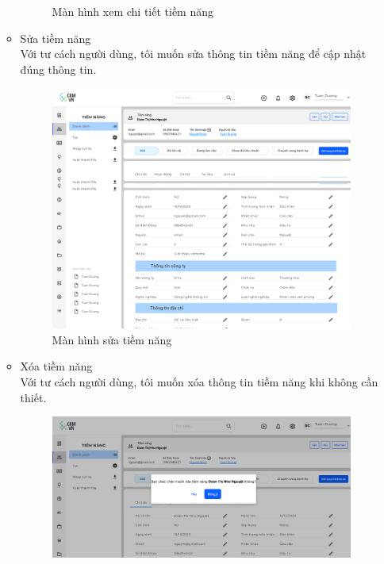 \documentclass[12pt,a4paper]{article}
\begin{document}
\begin{enumerate}
\begin{itemize}
\begin{figure}[H]
                \vspace{0.5cm}
                \caption{Màn hình xem chi tiết tiềm năng}
                \label{chitiettiemnang}
            \end{figure}
            \item Sửa tiềm năng \\
            Với tư cách người dùng, tôi muốn sửa thông tin tiềm năng để cập nhật đúng thông tin.
            \begin{figure}[H]
                \centering \includegraphics[width=\textwidth]{Img/Nguyet/chitiettiemnang.png}
                \vspace{0.5cm}
                \caption{Màn hình sửa tiềm năng}
                \label{suatiemnang}
            \end{figure}
            \item Xóa tiềm năng \\
            Với tư cách người dùng, tôi muốn xóa thông tin tiềm năng khi không cần thiết.
            \begin{figure}[H]
                \centering \includegraphics[width=\textwidth]{Img/Nguyet/xoatiemnang.png}

\end{figure}
\end{itemize}
\end{enumerate}
\end{document}
